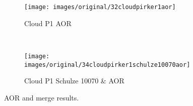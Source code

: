 \begin{figure}[htp] \centering
    \begin{subfigure}[b]{0.96\columnwidth}
        \texttt{[image: images/original/32cloudpirker1aor]}
        \caption{Cloud P1 AOR}
        \label{fig:32cloudpirker1aor} 
    \end{subfigure}\\
    \begin{subfigure}[b]{0.96\columnwidth}
        \texttt{[image: images/original/34cloudpirker1schulze10070aor]}
        \caption{Cloud P1 Schulze 10070 & AOR}
        \label{fig:34cloudpirker1schulze10070aor} 
    \end{subfigure}
    \caption{AOR and merge results.}
    \label{fig:35schulze10070aorradarandcloud}
\end{figure}